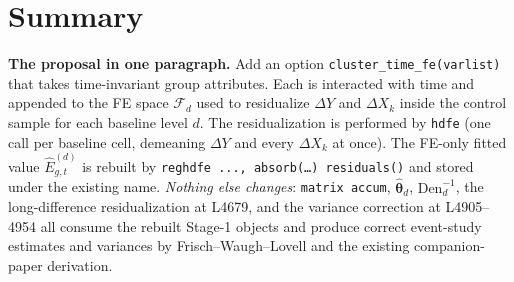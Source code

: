\documentclass[11pt]{article}
\newcommand{\code}[1]{\texttt{\small #1}}
\newcommand{\1}{\mathbb{1}}
\newcommand{\thetad}{\widehat{\bm{\theta}}_d}
\begin{document}
\section{Summary}

\begin{tcolorbox}[colback=codebg, colframe=navy, boxrule=0.6pt, arc=1pt]
\textbf{The proposal in one paragraph.}\;
Add an option \code{cluster\_time\_fe(varlist)} that takes time-invariant
group attributes. Each is interacted with time and appended to the FE space
$\mathcal{F}_d$ used to residualize $\Delta Y$ and $\Delta X_k$ inside the
control sample for each baseline level $d$. The residualization is performed
by \code{hdfe} (one call per baseline cell, demeaning $\Delta Y$ and every
$\Delta X_k$ at once). The FE-only fitted value
$\widehat{E}^{(d)}_{g,t}$ is rebuilt by \code{reghdfe ..., absorb(\dots)
residuals()} and stored under the existing name. \emph{Nothing else changes}:
\code{matrix accum}, $\thetad$, $\mathrm{Den}_d^{-1}$, the long-difference
residualization at L4679, and the variance correction at L4905--4954 all
consume the rebuilt Stage-1 objects and produce correct event-study
estimates and variances by Frisch--Waugh--Lovell and the existing
companion-paper derivation.
\end{tcolorbox}
\end{document}
